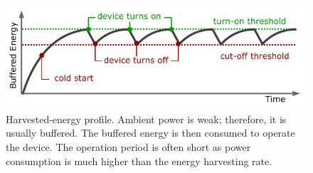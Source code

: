 \begin{figure}[b]
	\centering
		\includegraphics[width=\columnwidth]{figures/intermittent_operation}
		\caption{Harvested-energy profile. Ambient power is weak; therefore, it is usually buffered. The buffered energy is then consumed to operate the device. The operation period is often short as power consumption is much higher than the energy harvesting rate.
		}
		\label{fig:intermittent_opertaion}
\end{figure} 
%
